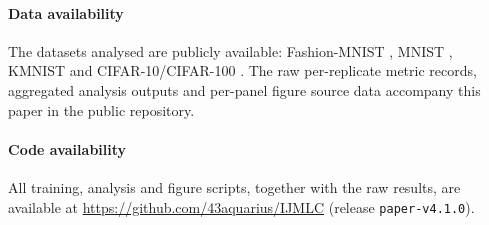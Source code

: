 \documentclass[11pt,a4paper]{article}
\begin{document}
\paragraph{Data availability}
The datasets analysed are publicly available: Fashion-MNIST
\citep{xiao2017}, MNIST \citep{lecun1998}, KMNIST \citep{clanuwat2018}
and CIFAR-10/CIFAR-100 \citep{krizhevsky2009}.
The raw per-replicate metric records, aggregated analysis outputs and
per-panel figure source data accompany this paper in the public
repository.

\paragraph{Code availability}
All training, analysis and figure scripts, together with the raw results,
are available at \url{https://github.com/43aquarius/IJMLC} (release
\texttt{paper-v4.1.0}).
\end{document}

